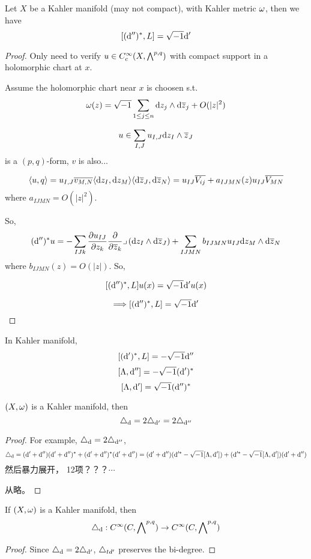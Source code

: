 \begin{thm}
Let $X$ be a Kahler manifold (may not compact), with Kahler metric $\omega$,
then we have
$$[(\mathrm{d}'')^*,L]=\sqrt{-1}\mathrm{d}'$$
\end{thm}

\begin{proof}
Only need to verify $u\in  C^\infty_c(X,\bigwedge\nolimits^{p,q})$
with compact support in a holomorphic chart at $x$.

Assume the holomorphic chart near $x$ is choosen s.t.
$$\omega(z)=\sqrt{-1}\sum_{1\leq j\leq n}\mathrm{d} z_j\wedge\mathrm{d}\overline{z}_j+O(|z|^2)$$

$$u\in\sum_{I,J}u_{I,J}\mathrm{d} z_I\wedge\overline{z}_J$$
is a $(p,q)$-form, $v$ is also...

$$\langle u,q\rangle= u_{I,J}\overline{v_{M,N}}
\langle \mathrm{d} z_I,\mathrm{d} z_M\rangle\langle\mathrm{d}\overline{z}_J,\mathrm{d}\overline{z}_N\rangle
=u_{IJ}\overline{V_{ij}}+a_{IJMN}(z)u_{IJ}\overline{V_{MN}}$$
where $a_{IJMN}=O(|z|^2)$.

So,
$$(\mathrm{d}'')^*u=-\sum_{IJk}\frac{\partial u_{IJ}} {\partial z_k}\frac{\partial } {\partial \overline{z}_k}
\lrcorner\,(\mathrm{d} z_I\wedge\mathrm{d}\overline{z}_J)+
\sum_{IJMN}b_{IJMN}u_{IJ}\mathrm{d} z_M\wedge\mathrm{d}\overline{z}_N
$$
where $b_{IJMN}(z)=O(|z|)$. So,

$$[(\mathrm{d}'')^*,L]u(x)=
\sqrt{-1}\mathrm{d}'u(x)$$

$$\Longrightarrow [(\mathrm{d}'')^*,L]=\sqrt{-1}\mathrm{d}'$$
\end{proof}

\begin{prop}In Kahler manifold,
$$[(\mathrm{d}')^*,L]=-\sqrt{-1}\mathrm{d}''$$
$$[\Lambda,\mathrm{d}'']=-\sqrt{-1}(\mathrm{d}')^*$$
$$[\Lambda,\mathrm{d}']=\sqrt{-1}(\mathrm{d}'')^*$$
\end{prop}

\begin{cor}$(X,\omega)$ is a Kahler manifold, then
$$\triangle_{\mathrm{d}}=2\triangle_{\mathrm{d}'}=2\triangle_{\mathrm{d}''}$$
\end{cor}
\begin{proof}
For example, $\triangle_{\mathrm{d}}=2\triangle_{\mathrm{d}''}$,
$$\triangle_{\mathrm{d}}=(\mathrm{d}'+\mathrm{d}'')(\mathrm{d}'+\mathrm{d}'')^*+(\mathrm{d}'+\mathrm{d}'')^*(\mathrm{d}'+\mathrm{d}'')
=(\mathrm{d}'+\mathrm{d}'')(\mathrm{d}'^*-\sqrt{-1}[\Lambda,\mathrm{d}'])
+(\mathrm{d}'^*-\sqrt{-1}[\Lambda,\mathrm{d}'])(\mathrm{d}'+\mathrm{d}'')$$
然后暴力展开， 12项？？？$\cdots$

从略。
\end{proof}

\begin{cor}
If $(X,\omega)$ is a Kahler manifold, then
$$\triangle_{\mathrm{d}}:C^\infty(C,\bigwedge\nolimits^{p,q})\to C^\infty(C,\bigwedge\nolimits^{p,q})$$
\end{cor}
\begin{proof}
Since $\triangle_{\mathrm{d}}=2\triangle_{\mathrm{d}'}$,
$\triangle_{td'}$ preserves the bi-degree.
\end{proof}

